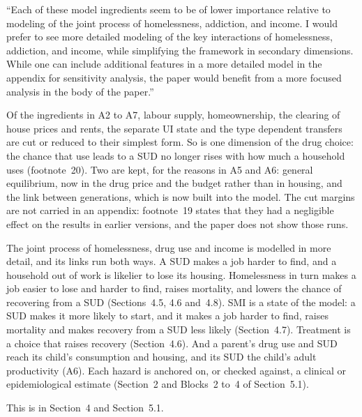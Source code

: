\documentclass[11pt]{article}
\begin{document}
\begin{referee}
``Each of these model ingredients seem to be of lower importance relative to
modeling of the joint process of homelessness, addiction, and income. I would
prefer to see more detailed modeling of the key interactions of homelessness,
addiction, and income, while simplifying the framework in secondary dimensions.
While one can include additional features in a more detailed model in the appendix
for sensitivity analysis, the paper would benefit from a more focused analysis in
the body of the paper.''
\end{referee}
\begin{response}
Of the ingredients in A2 to A7, labour supply, homeownership, the clearing of house
prices and rents, the separate UI state and the type dependent transfers are cut or
reduced to their simplest form. So is one dimension of the drug choice: the chance
that use leads to a SUD no longer rises with how much a household uses
(footnote~20). Two are kept, for the reasons in A5 and A6: general equilibrium, now
in the drug price and the budget rather than in housing, and the link between
generations, which is now built into the model. The cut margins are not carried in
an appendix: footnote~19 states that they had a negligible effect on the results in
earlier versions, and the paper does not show those runs.

The joint process of homelessness, drug use and income is modelled in more detail,
and its links run both ways. A SUD makes a job harder to find, and a household out
of work is likelier to lose its housing. Homelessness in turn makes a job easier to
lose and harder to find, raises mortality, and lowers the chance of recovering from
a SUD (Sections~4.5, 4.6 and~4.8). SMI is a state of the model: a SUD makes it more
likely to start, and it makes a job harder to find, raises mortality and makes
recovery from a SUD less likely (Section~4.7). Treatment is a choice that raises
recovery (Section~4.6). And a parent's drug use and SUD reach its child's
consumption and housing, and its SUD the child's adult productivity (A6). Each
hazard is anchored on, or checked against, a clinical or epidemiological estimate
(Section~2 and Blocks~2 to~4 of Section~5.1).

This is in Section~4 and Section~5.1.
\end{response}
\end{document}
